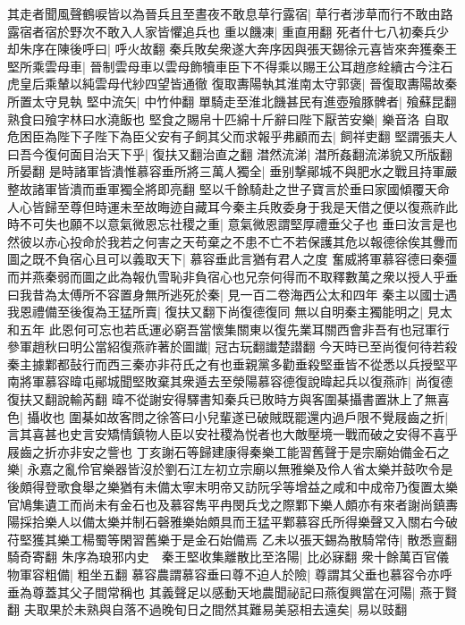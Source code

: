 其走者聞風聲鶴唳皆以為晉兵且至晝夜不敢息草行露宿|{
	草行者涉草而行不敢由路露宿者宿於野次不敢入人家皆懼追兵也}
重以饑凍|{
	重直用翻}
死者什七八初秦兵少却朱序在陳後呼曰|{
	呼火故翻}
秦兵敗矣衆遂大奔序因與張天錫徐元喜皆來奔獲秦王堅所乘雲母車|{
	晉制雲母車以雲母飾犢車臣下不得乘以賜王公耳趙彦絟續古今注石虎皇后乘輦以純雲母代紗四望皆通徹}
復取夀陽執其淮南太守郭褒|{
	晉復取夀陽故秦所置太守見執}
堅中流矢|{
	中竹仲翻}
單騎走至淮北饑甚民有進壺飱豚髀者|{
	飱蘇昆翻熟食曰飱字林曰水澆飯也}
堅食之賜帛十匹綿十斤辭曰陛下厭苦安樂|{
	樂音洛}
自取危困臣為陛下子陛下為臣父安有子飼其父而求報乎弗顧而去|{
	飼祥吏翻}
堅謂張夫人曰吾今復何面目治天下乎|{
	復扶又翻治直之翻}
澘然流涕|{
	澘所姦翻流涕貌又所版翻所晏翻}
是時諸軍皆潰惟慕容垂所將三萬人獨全|{
	垂别撃鄖城不與肥水之戰且持軍嚴整故諸軍皆潰而垂軍獨全將即亮翻}
堅以千餘騎赴之世子寶言於垂曰家國傾覆天命人心皆歸至尊但時運未至故晦迹自藏耳今秦主兵敗委身于我是天借之便以復燕祚此時不可失也願不以意氣微恩忘社稷之重|{
	意氣微恩謂堅厚禮垂父子也}
垂曰汝言是也然彼以赤心投命於我若之何害之天苟棄之不患不亡不若保護其危以報德徐俟其釁而圖之既不負宿心且可以義取天下|{
	慕容垂此言猶有君人之度}
奮威將軍慕容德曰秦彊而并燕秦弱而圖之此為報仇雪恥非負宿心也兄奈何得而不取釋數萬之衆以授人乎垂曰我昔為太傅所不容置身無所逃死於秦|{
	見一百二卷海西公太和四年}
秦主以國士遇我恩禮備至後復為王猛所賣|{
	復扶又翻下尚復德復同}
無以自明秦主獨能明之|{
	見太和五年}
此恩何可忘也若氐運必窮吾當懷集關東以復先業耳關西會非吾有也冠軍行參軍趙秋曰明公當紹復燕祚著於圖䜟|{
	冠古玩翻䜟楚譛翻}
今天時已至尚復何待若殺秦主據鄴都鼔行而西三秦亦非苻氏之有也垂親黨多勸垂殺堅垂皆不從悉以兵授堅平南將軍慕容暐屯鄖城聞堅敗棄其衆遁去至滎陽慕容德復說暐起兵以復燕祚|{
	尚復德復扶又翻說輸芮翻}
暐不從謝安得驛書知秦兵已敗時方與客圍棊攝書置牀上了無喜色|{
	攝收也}
圍棊如故客問之徐答曰小兒輩遂已破賊既罷還内過戶限不覺屐齒之折|{
	言其喜甚也史言安矯情鎮物人臣以安社稷為悦者也大敵壓境一戰而破之安得不喜乎屐齒之折亦非安之訾也}
丁亥謝石等歸建康得秦樂工能習舊聲于是宗廟始備金石之樂|{
	永嘉之亂伶官樂器皆沒於劉石江左初立宗廟以無雅樂及伶人省太樂并鼓吹令是後頗得登歌食舉之樂猶有未備太寧末明帝又訪阮孚等增益之咸和中成帝乃復置太樂官鳩集遺工而尚未有金石也及慕容雋平冉閔兵戈之際鄴下樂人頗亦有來者謝尚鎮夀陽採拾樂人以備太樂并制石磬雅樂始頗具而王猛平鄴慕容氏所得樂聲又入關右今破苻堅獲其樂工楊蜀等閑習舊樂于是金石始備焉}
乙未以張天錫為散騎常侍|{
	散悉亶翻騎奇寄翻}
朱序為琅邪内史　秦王堅收集離散比至洛陽|{
	比必寐翻}
衆十餘萬百官儀物軍容粗備|{
	粗坐五翻}
慕容農謂慕容垂曰尊不迫人於險|{
	尊謂其父垂也慕容令亦呼垂為尊蓋其父子間常稱也}
其義聲足以感動天地農聞祕記曰燕復興當在河陽|{
	燕于賢翻}
夫取果於未熟與自落不過晚旬日之間然其難易美惡相去遠矣|{
	易以豉翻}
